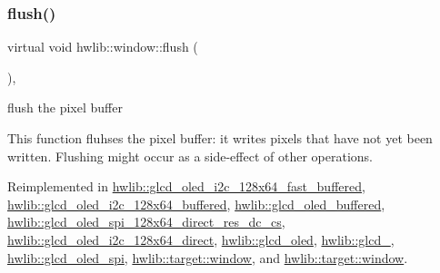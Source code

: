 \mbox{\label{classhwlib_1_1window_a2b654a98872d174173e1df24a444c949}} 
\subsubsection{\texorpdfstring{flush()}{flush()}\hspace{0.1cm}{\footnotesize\ttfamily [2/2]}}
{\footnotesize\ttfamily virtual void hwlib\+::window\+::flush (\begin{DoxyParamCaption}{ }\end{DoxyParamCaption})\hspace{0.3cm}{\ttfamily [inline]}, {\ttfamily [virtual]}}



flush the pixel buffer 

This function fluhses the pixel buffer\+: it writes pixels that have not yet been written. Flushing might occur as a side-\/effect of other operations. 

Reimplemented in \hyperlink{classhwlib_1_1glcd__oled__i2c__128x64__fast__buffered_a799b9725f8b535d8fe22b18ffd98af8e}{hwlib\+::glcd\+\_\+oled\+\_\+i2c\+\_\+128x64\+\_\+fast\+\_\+buffered}, \hyperlink{classhwlib_1_1glcd__oled__i2c__128x64__buffered_aa2f62fb4a54ea1cfa9f608e703fd046e}{hwlib\+::glcd\+\_\+oled\+\_\+i2c\+\_\+128x64\+\_\+buffered}, \hyperlink{classhwlib_1_1glcd__oled__buffered_a68ed87e12c7f7ed0abe621b14af9d604}{hwlib\+::glcd\+\_\+oled\+\_\+buffered}, \hyperlink{classhwlib_1_1glcd__oled__spi__128x64__direct__res__dc__cs_ada856fccd0e72f8e95172e1aa901024c}{hwlib\+::glcd\+\_\+oled\+\_\+spi\+\_\+128x64\+\_\+direct\+\_\+res\+\_\+dc\+\_\+cs}, \hyperlink{classhwlib_1_1glcd__oled__i2c__128x64__direct_a65a496d65b3a99fe9334e0981b706533}{hwlib\+::glcd\+\_\+oled\+\_\+i2c\+\_\+128x64\+\_\+direct}, \hyperlink{classhwlib_1_1glcd__oled_a58e191e5350f349facee130513a08b75}{hwlib\+::glcd\+\_\+oled}, \hyperlink{classhwlib_1_1glcd__5510_ac53cb29b0973166ae3f54940a71317bf}{hwlib\+::glcd\+\_}, \hyperlink{classhwlib_1_1glcd__oled__spi_a4bed9116dda2cc6752ac5447a834fa0f}{hwlib\+::glcd\+\_\+oled\+\_\+spi}, \hyperlink{classhwlib_1_1target_1_1window_a00ef1d2bba8684306ee8051fbf469900}{hwlib\+::target\+::window}, and \hyperlink{classhwlib_1_1target_1_1window_a00ef1d2bba8684306ee8051fbf469900}{hwlib\+::target\+::window}.

\mbox{\label{classhwlib_1_1window_af71f072f7b94f82647fc582b053d4576}} 
